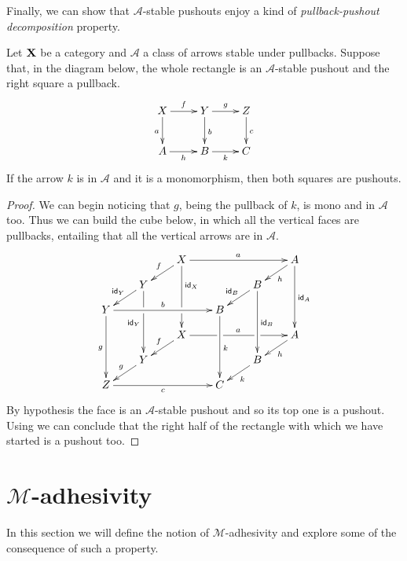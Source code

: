 Finally, we can show that $\mathcal{A}$-stable pushouts enjoy a kind of \emph{pullback-pushout decomposition} property.

\begin{proposition}\label{prop:stab}Let $\textbf {\textup{X}}$ be a category and $\mathcal{A}$ a class of arrows stable under pullbacks. Suppose that, in the diagram below, the whole rectangle is an $\mathcal{A}$-stable pushout and the right square a pullback.
	\[\xymatrix{X \ar[d]_{a} \ar[r]^{f}& \ar[r]^{g} Y \ar[d]^{b}& Z \ar[d]^{c}\\ A \ar[r]_{h}& B \ar[r]_{k}& C}\]
	If the arrow $k$ is in $\mathcal{A}$ and it is a monomorphism,  then both squares are pushouts.
\end{proposition}

\begin{proof} We can begin noticing that $g$, being the pullback of $k$, is mono and in $\mathcal{A}$ too. Thus we can build the cube below, in which all the vertical faces are pullbacks, entailing that all the vertical arrows are in $\mathcal{A}$.
	\[\xymatrix@C=20pt@R=10pt{ & &X\ar[dl]_{f} \ar[ddd]^(.333333){\id{X}}|(.666666)\hole\ar[rrr]^{a} &&&A \ar[ddd]^{\id{A}} \ar[dl]^{h}\\& Y\ar[dl]_{\id{Y}} \ar[ddd]|(.333333)\hole_{\id{Y}} &&&B \ar[ddd]^{\id{B}} \ar[dl]_{\id{B}} \\Y \ar[ddd]_{g} \ar[rrr]^{b}&&& B\ar[ddd]^{k}\\&&X \ar[rrr]|(.34)\hole^{a}|(.67)\hole \ar[dl]_{f}&&& A \ar[dl]^{h}\\ & Y  \ar[dl]_{g}&&& B \ar[dl]^{k}\\ Z\ar[rrr]_{c} &&& C}\]
	By hypothesis the face is an $\mathcal{A}$-stable pushout and so its top one is a pushout. Using  we can conclude that the right half of the rectangle with which we have started is a pushout too. \qedhere 
\end{proof}

\section{$\mathcal{M}$-adhesivity}

In this section we will define the notion of $\mathcal{M}$-adhesivity \cite{azzi2019essence,ehrig2012,ehrig2014adhesive,heindel2009category,lack2005adhesive} and explore some of the consequence of such a property. 

